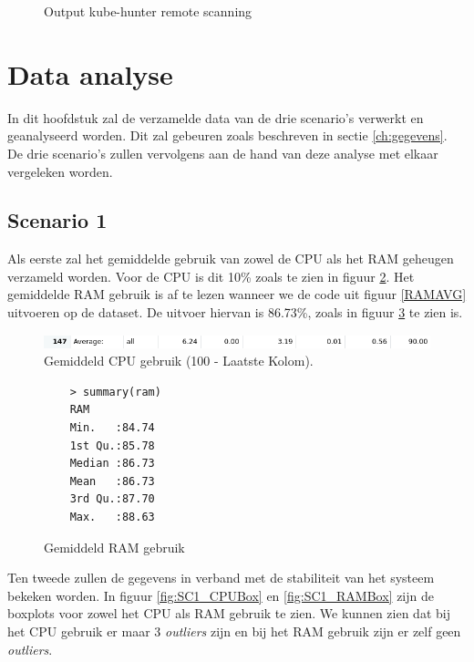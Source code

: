 \begin{figure}[h] 
	\centering
	\inputminted[fontsize=\footnotesize,linenos]{yaml}{files/hunterJob.yaml}
	\caption{Output kube-hunter remote scanning}
	\label{hunterjob}
\end{figure}

\clearpage
\section{Data analyse} 
In dit hoofdstuk zal de verzamelde data van de drie scenario's verwerkt en geanalyseerd worden. Dit zal gebeuren zoals beschreven in sectie \ref{ch:gegevens}. De drie scenario's zullen vervolgens aan de hand van deze analyse met elkaar vergeleken worden.

\clearpage
\subsection{Scenario 1}
Als eerste zal het gemiddelde gebruik van zowel de CPU als het RAM geheugen verzameld worden. Voor de CPU is dit 10\% zoals te zien in figuur \ref{fig:SC1_CPUAVG}. Het gemiddelde RAM gebruik is af te lezen wanneer we de code uit figuur \ref{RAMAVG} uitvoeren op de dataset. De uitvoer hiervan is 86.73\%, zoals in figuur \ref{SC1_RAMAVG} te zien is.
\begin{figure}[h]
	\centering
	\includegraphics[width=\linewidth]{img/SC1_CPUAVG.png}
	\caption{Gemiddeld CPU gebruik (100 - Laatste Kolom).}
	\label{fig:SC1_CPUAVG}
\end{figure}
\begin{figure}[h]
	\centering
	\begin{verbatim} 
	> summary(ram)
	RAM       
	Min.   :84.74  
	1st Qu.:85.78  
	Median :86.73  
	Mean   :86.73  
	3rd Qu.:87.70  
	Max.   :88.63
	\end{verbatim}
	\caption{Gemiddeld RAM gebruik}
	\label{SC1_RAMAVG}
\end{figure}

Ten tweede zullen de gegevens in verband met de stabiliteit van het systeem bekeken worden. In figuur \ref{fig:SC1_CPUBox} en \ref{fig:SC1_RAMBox} zijn de boxplots voor zowel het CPU als RAM gebruik te zien. We kunnen zien dat bij het CPU gebruik er maar 3 \textit{outliers} zijn en bij het RAM gebruik zijn er zelf geen \textit{outliers}. 

